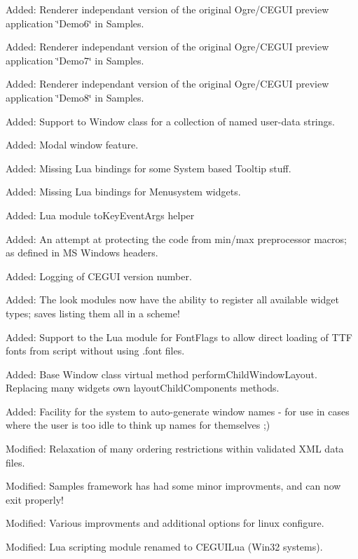 \begin{DoxyItemize}
\item Added\+: Renderer independant version of the original Ogre/\+C\+E\+G\+UI preview application \char`\"{}\+Demo6\char`\"{} in Samples.
\item Added\+: Renderer independant version of the original Ogre/\+C\+E\+G\+UI preview application \char`\"{}\+Demo7\char`\"{} in Samples.
\item Added\+: Renderer independant version of the original Ogre/\+C\+E\+G\+UI preview application \char`\"{}\+Demo8\char`\"{} in Samples.
\item Added\+: Support to Window class for a collection of named user-\/data strings.
\item Added\+: Modal window feature.
\item Added\+: Missing Lua bindings for some System based Tooltip stuff.
\item Added\+: Missing Lua bindings for Menusystem widgets.
\item Added\+: Lua module \textquotesingle{}to\+Key\+Event\+Args\textquotesingle{} helper
\item Added\+: An attempt at protecting the code from min/max preprocessor macros; as defined in MS Windows headers.
\item Added\+: Logging of C\+E\+G\+UI version number.
\item Added\+: The \textquotesingle{}look\textquotesingle{} modules now have the ability to register all available widget types; saves listing them all in a scheme!
\item Added\+: Support to the Lua module for Font\+Flags to allow direct loading of T\+TF fonts from script without using .font files.
\item Added\+: Base Window class virtual method \textquotesingle{}perform\+Child\+Window\+Layout\textquotesingle{}. Replacing many widget\textquotesingle{}s own \textquotesingle{}layout\+Child\+Components\textquotesingle{} methods.
\item Added\+: Facility for the system to auto-\/generate window names -\/ for use in cases where the user is too idle to think up names for themselves ;)
\item Modified\+: Relaxation of many ordering restrictions within validated X\+ML data files.
\item Modified\+: Samples framework has had some minor improvments, and can now exit properly!
\item Modified\+: Various improvments and additional options for linux configure.
\item Modified\+: Lua scripting module renamed to C\+E\+G\+U\+I\+Lua (Win32 systems).

\end{DoxyItemize}
